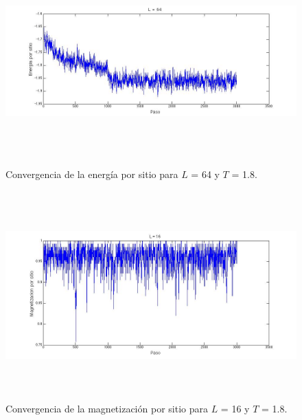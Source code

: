 \documentclass[a4paper,12pt]{article}
\begin{document}
\begin{figure}[H]
\begin{center}
\includegraphics[height=8cm]{../graficos/En_L64_T18.jpg}
\caption[width=5cm]{Convergencia de la energ\'ia por sitio para $L$ = 64 y $T$ = 1.8.}
\end{center}
\end{figure}

\begin{figure}[H]
\begin{center}
\includegraphics[height=8cm]{../graficos/Mag_L16_T18.jpg}
\caption[width=5cm]{Convergencia de la magnetizaci\'on por sitio para $L$ = 16 y $T$ = 1.8.}
\end{center}
\end{figure}
\end{document}
